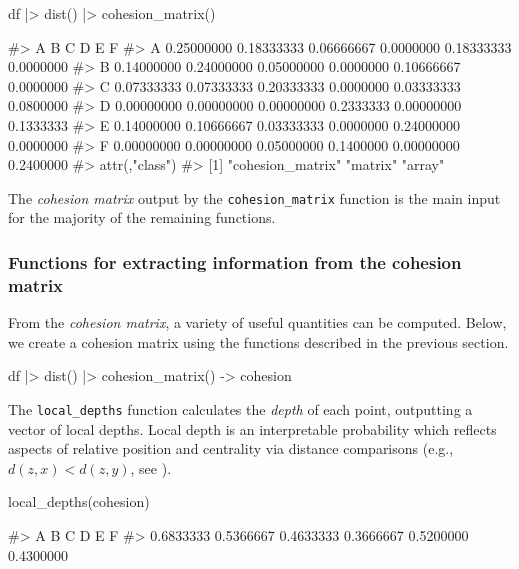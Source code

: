 \begin{Schunk}
\begin{Sinput}
df |>
  dist() |>
  cohesion_matrix()
\end{Sinput}
\begin{Soutput}
#>            A          B          C         D          E         F
#> A 0.25000000 0.18333333 0.06666667 0.0000000 0.18333333 0.0000000
#> B 0.14000000 0.24000000 0.05000000 0.0000000 0.10666667 0.0000000
#> C 0.07333333 0.07333333 0.20333333 0.0000000 0.03333333 0.0800000
#> D 0.00000000 0.00000000 0.00000000 0.2333333 0.00000000 0.1333333
#> E 0.14000000 0.10666667 0.03333333 0.0000000 0.24000000 0.0000000
#> F 0.00000000 0.00000000 0.05000000 0.1400000 0.00000000 0.2400000
#> attr(,"class")
#> [1] "cohesion_matrix" "matrix"          "array"
\end{Soutput}
\end{Schunk}

The \emph{cohesion matrix} output by the \texttt{cohesion\_matrix}
function is the main input for the majority of the remaining functions.

\hypertarget{functions-for-extracting-information-from-the-cohesion-matrix}{%
\subsubsection{Functions for extracting information from the cohesion
matrix}\label{functions-for-extracting-information-from-the-cohesion-matrix}}

From the \emph{cohesion matrix}, a variety of useful quantities can be
computed. Below, we create a cohesion matrix using the functions
described in the previous section.

\begin{Schunk}
\begin{Sinput}
df |>
  dist() |>
  cohesion_matrix() -> cohesion
\end{Sinput}
\end{Schunk}

The \texttt{local\_depths} function calculates the \emph{depth} of each
point, outputting a vector of local depths. Local depth is an
interpretable probability which reflects aspects of relative position
and centrality via distance comparisons (e.g., \(d(z, x) < d(z, y)\),
see \citet{berenhaut2022social}).

\begin{Schunk}
\begin{Sinput}
local_depths(cohesion)
\end{Sinput}
\begin{Soutput}
#>         A         B         C         D         E         F 
#> 0.6833333 0.5366667 0.4633333 0.3666667 0.5200000 0.4300000
\end{Soutput}
\end{Schunk}

